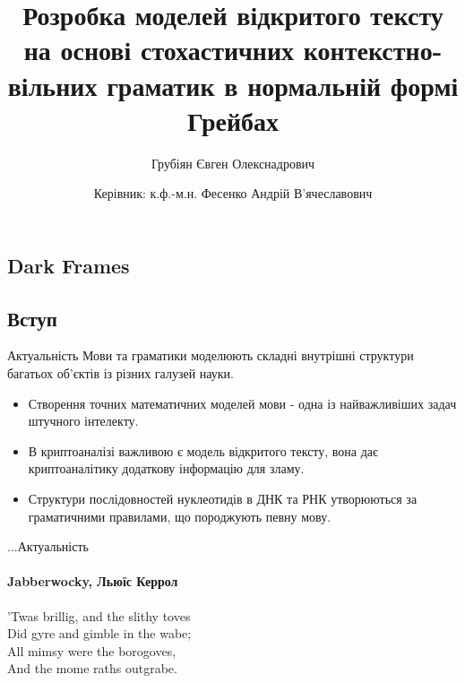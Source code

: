 \documentclass{beamer}
\title{Розробка моделей відкритого тексту на основі стохастичних контекстно-вільних граматик в нормальній формі Грейбах} %
\subtitle{Грубіян Євген Олекснадрович}
\author{Керівник: к.ф.-м.н. Фесенко Андрій В'ячеславович}
\begin{document}
  \frame{\maketitle}



  \begin{darkframes}
    \section{Dark Frames}
    \subsection{Вступ}
    \begin{frame}{Актуальність}
      Мови та граматики моделюють складні внутрішні структури багатьох об'єктів із різних галузей науки.
      \begin{itemize}
        \item Створення точних математичних моделей мови - одна із найважливіших задач штучного інтелекту.
        \item В криптоаналізі важливою є модель відкритого тексту, вона дає криптоаналітику додаткову інформацію для зламу.
        \item Структури послідовностей нуклеотидів в ДНК та РНК утворюються за граматичними правилами, що породжують певну мову.
      \end{itemize}
    \end{frame}

    \begin{frame}{...Актуальність}
      \framesubtitle{Jabberwocky, Льюїс Керрол}%
      'Twas brillig, and the slithy toves\\
      Did gyre and gimble in the wabe;\\
      All mimsy were the borogoves,\\
      And the mome raths outgrabe.\\\bigskip


\end{frame}
\end{darkframes}
\end{document}
